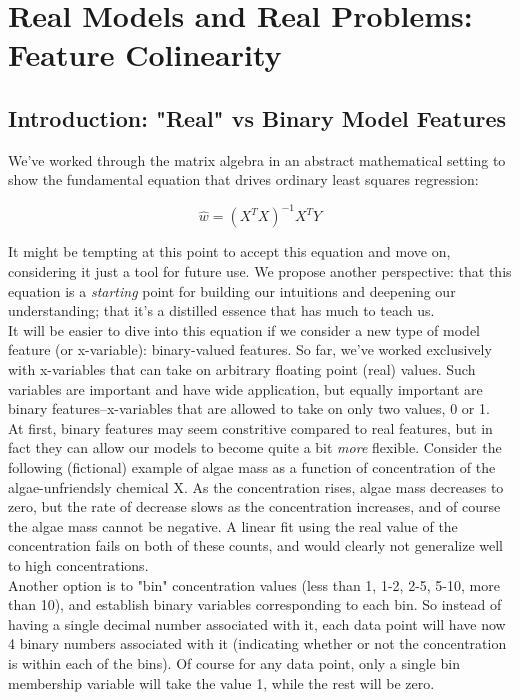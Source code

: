 \section{Real Models and Real Problems: Feature Colinearity}

\subsection{Introduction: "Real" vs Binary Model Features}

We've worked through the matrix algebra in an abstract mathematical setting to
show the fundamental equation that drives ordinary least squares regression:

\begin{equation} \hat{w} = (X^T X)^{-1} X^T Y \end{equation}

It might be tempting at this point to accept this equation and move on,
considering it just a tool for future use.  We propose another perspective: that
this equation is a \emph{starting} point for building our intuitions and
deepening our understanding; that it's a distilled essence that has much to
teach us. \\

It will be easier to dive into this equation if we consider a new type of
model feature (or x-variable): binary-valued features.  So far, we've worked
exclusively with x-variables that can take on arbitrary floating point (real)
values.  Such variables are important and have wide application, but equally
important are binary features--x-variables that are allowed to take on only two
values, 0 or 1.\\

At first, binary features may seem constritive compared to real features, but in
fact they can allow our models to become quite a bit \emph{more} flexible.
Consider the following (fictional) example of algae mass as a function of
concentration of the algae-unfriendsly chemical X.  As the concentration rises,
algae mass decreases to zero, but the rate of decrease slows as the
concentration increases, and of course the algae mass cannot be negative.  A
linear fit using the real value of the concentration fails on both of these
counts, and would clearly not generalize well to high concentrations.\\

Another option is to "bin" concentration values (less than 1, 1-2, 2-5, 5-10,
more than 10), and establish binary variables corresponding to each bin.  So
instead of having a single decimal number associated with it, each data point
will have now 4 binary numbers associated with it (indicating whether or not the
concentration is within each of the bins).  Of course for any data point, only a
single bin membership variable will take the value 1, while the rest will be
zero. \\

